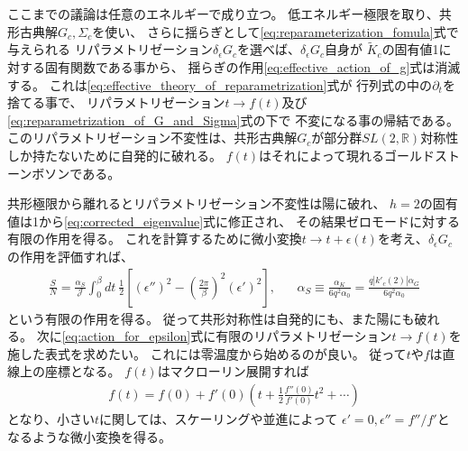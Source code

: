 ここまでの議論は任意のエネルギーで成り立つ。
低エネルギー極限を取り、共形古典解$G_c,\Sigma_c$を使い、
さらに揺らぎとして\eqref{eq:reparameterization_fomula}式で与えられる
リパラメトリゼーション$\delta_{\epsilon}G_c$を選べば、$\delta_{\epsilon}G_c$自身が
$\tilde{K}_c$の固有値1に対する固有関数である事から、
揺らぎの作用\eqref{eq:effective_action_of_g}式は消滅する。
これは\eqref{eq:effective_theory_of_reparametrization}式が
行列式の中の$\partial_t$を捨てる事で、
リパラメトリゼーション$t\to f(t)$及び\eqref{eq:reparametrization_of_G_and_Sigma}式の下で
不変になる事の帰結である。
このリパラメトリゼーション不変性は、共形古典解$G_c$が部分群$SL(2,\mathbb{R})$対称性
しか持たないために自発的に破れる。
$f(t)$はそれによって現れるゴールドストーンボソンである。

共形極限から離れるとリパラメトリゼーション不変性は陽に破れ、
$h=2$の固有値は1から\eqref{eq:corrected_eigenvalue}式に修正され、
その結果ゼロモードに対する有限の作用を得る。
これを計算するために微小変換$t\to t + \epsilon(t)$を考え、$\delta_{\epsilon}G_c$の作用を評価すれば、
\begin{align}
	\frac{S}{N} = \frac{\alpha_S}{\mathcal{J}}\int_0^{\beta}dt\ \frac{1}{2}
		\left[
			\left(\epsilon''\right)^2 - \left(\frac{2\pi}{\beta}\right)^2(\epsilon')^2
		\right],\hspace{20pt}
	\alpha_S \equiv \frac{\alpha_K}{6q^2\alpha_0} = \frac{q|k'_c(2)|\alpha_G}{6q^2\alpha_0}
	\label{eq:action_for_epsilon}
\end{align}
という有限の作用を得る。
従って共形対称性は自発的にも、また陽にも破れる。
次に\eqref{eq:action_for_epsilon}式に有限のリパラメトリゼーション$t\to f(t)$を施した表式を求めたい。
これには零温度から始めるのが良い。
従って$t$や$f$は直線上の座標となる。
$f(t)$はマクローリン展開すれば
\begin{align}
	f(t) = f(0) + f'(0)\left(t
		+ \frac{1}{2}\frac{f''(0)}{f'(0)}t^2 + \cdots
	\right)
\end{align}
となり、小さい$t$に関しては、スケーリングや並進によって
$\epsilon' = 0, \epsilon'' = f''/f'$となるような微小変換を得る。


\pagebreak